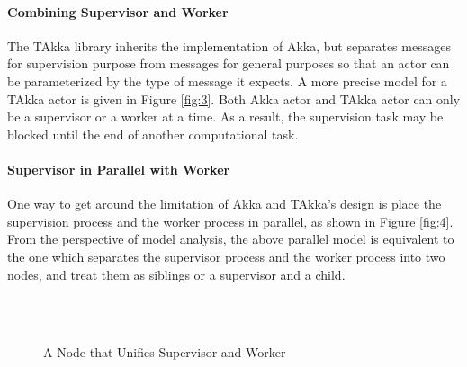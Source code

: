 \documentclass[12pt, authoryear]{article}
\begin{document}
\paragraph{Combining Supervisor and Worker}  The TAkka library inherits the 
implementation of Akka, but separates messages for supervision purpose from 
messages for general purposes so that an actor can be parameterized by the 
type of message it expects.  A more precise model for a TAkka actor is given in 
Figure \ref{fig:3}.  Both Akka actor and TAkka actor can only be a supervisor 
or a worker at a time.  As a result, the supervision task may be blocked until 
the end of another computational task.


\paragraph{Supervisor in Parallel with Worker}  One way to get around the 
limitation of Akka and TAkka's design is place the supervision process and the 
worker process in parallel, as shown in Figure \ref{fig:4}.  From the 
perspective of model analysis, the above parallel model is equivalent to the 
one which separates the supervisor process and the worker process into two 
nodes, and treat them as siblings or a supervisor and a child.



\begin{figure}
  \centering         
        \\
        \\
    \caption{A Node that Unifies Supervisor and Worker}
   \label{fig:unify}
\end{figure}
\end{document}
